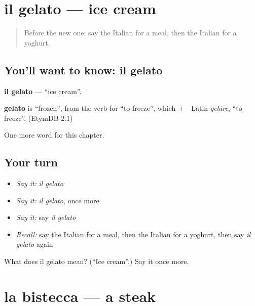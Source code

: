 \section[il gelato]{il gelato — ice cream}

\label{lesson:IT-C109-gelato}



\begin{quote}
Before the new one: say the Italian for a meal, then the Italian for a yoghurt.
\end{quote}

\subsection*{You'll want to know: il gelato}
\textbf{il gelato} — \textquotedblleft{}ice cream\textquotedblright{}.

\begin{cousinweb}
\textbf{gelato} is \textquotedblleft{}frozen\textquotedblright{}, from the verb for \textquotedblleft{}to freeze\textquotedblright{}, which $\leftarrow$ Latin \emph{gelare}, \textquotedblleft{}to freeze\textquotedblright{}. (EtymDB 2.1)
\end{cousinweb}

\begin{grammarlens}[title={What you've built}]
One more word for this chapter.
\end{grammarlens}

\subsection*{Your turn}
\begin{itemize}
\raggedright
  \item \emph{Say it:} \emph{il gelato}
  \item \emph{Say it:} \emph{il gelato}, once more
  \item \emph{Say it:} say \emph{il gelato}
  \item \emph{Recall:} say the Italian for a meal, then the Italian for a yoghurt, then say \emph{il gelato} again
\end{itemize}

\begin{tcolorbox}[breakable,colback=teal!4,colframe=teal!35!black,title={Before you move on}]
What does il gelato mean? (\textquotedblleft{}Ice cream\textquotedblright{}.) Say it once more.
\end{tcolorbox}
\section[la bistecca]{la bistecca — a steak}

